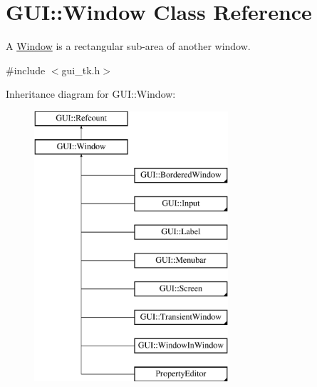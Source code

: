 \hypertarget{classGUI_1_1Window}{\section{G\-U\-I\-:\-:Window Class Reference}
\label{classGUI_1_1Window}
}


A \hyperlink{classGUI_1_1Window}{Window} is a rectangular sub-\/area of another window.  




{\ttfamily \#include $<$gui\-\_\-tk.\-h$>$}

Inheritance diagram for G\-U\-I\-:\-:Window\-:\begin{figure}[H]
\begin{center}
\leavevmode
\includegraphics[height=10.000000cm]{classGUI_1_1Window}
\end{center}
\end{figure}

